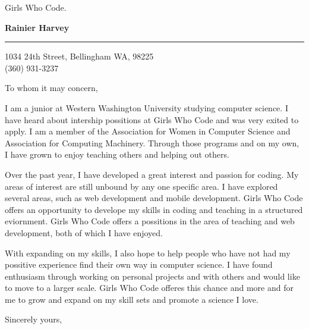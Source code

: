 \documentclass{letter} %
\begin{document}
\signature{%
Rainier Harvey}           %
\longindentation=0pt                       %
\let\raggedleft\raggedright                %
 
 
\begin{letter}{Girls Who Code. \\}


\begin{flushleft}
{\large\bf Rainier Harvey}
\end{flushleft}
\medskip\hrule height 1pt
\begin{flushright}
\hfill 1034 24th Street, Bellingham WA, 98225\\
\hfill (360) 931-3237 
\end{flushright} 
\vfill %

 
\opening{To whom it may concern,} 
 
\noindent I am a junior at Western Washington University studying computer science. I have heard about intership possitions at Girls Who Code and was very exited to apply. 
I am a member of the Association for Women in Computer Science and Association for Computing Machinery. Through those programs and on my own, I have grown to enjoy teaching 
others and helping out others. 
 
\noindent Over the past year, I have developed a great interest and passion for coding. My areas of interest are still unbound by any one specific area. I have explored several areas, 
such as web development and mobile development. Girls Who Code offers an opportunity to develope my skills in coding and teaching in a structured eviornment. 
Girls Who Code offers a possitions in the area of teaching and web development, both of which I have enjoyed. 

\noindent With expanding on my skills, I also hope to help people who have not had my possitive experience find their own way in computer science.
I have found enthusiasm through working on personal projects and with others and would like to 
move to a larger scale. Girls Who Code offeres this chance and more and for me to grow and expand on my skill sets and promote a science I love.
 
\closing{Sincerely yours,} 

 
\end{letter}
 
\end{document}
